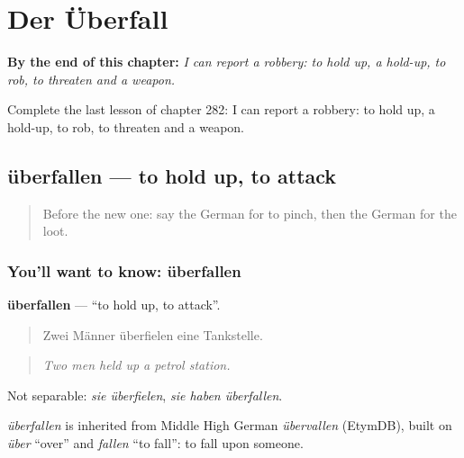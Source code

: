
\chapter{Der Überfall}
\label{ch:ge-der-uberfall}

\begin{chapteropening}
\textbf{By the end of this chapter:} \emph{I can report a robbery: to hold up, a hold-up, to rob, to threaten and a weapon.}

Complete the last lesson of chapter 282: I can report a robbery: to hold up, a hold-up, to rob, to threaten and a weapon.
\end{chapteropening}

\section[überfallen]{überfallen — to hold up, to attack}

\label{lesson:GE-C282-ueberfallen}



\begin{quote}
Before the new one: say the German for to pinch, then the German for the loot.
\end{quote}

\subsection*{You'll want to know: überfallen}
\textbf{überfallen} — \textquotedblleft{}to hold up, to attack\textquotedblright{}.

\begin{quote}
Zwei Männer überfielen eine Tankstelle.
\end{quote}

\begin{quote}
\emph{Two men held up a petrol station.}
\end{quote}

Not separable: \emph{sie überfielen}, \emph{sie haben überfallen}.

\begin{cousinweb}
\emph{überfallen} is inherited from Middle High German \emph{übervallen} (EtymDB), built on \emph{über} \textquotedblleft{}over\textquotedblright{} and \emph{fallen} \textquotedblleft{}to fall\textquotedblright{}: to fall upon someone.
\end{cousinweb}

